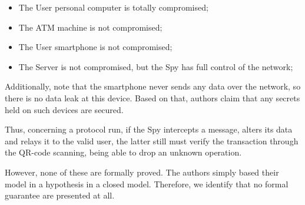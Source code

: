 \begin{itemize}
  \item The User personal computer is totally compromised;
  \item The ATM machine is not compromised;
  \item The User smartphone is not compromised;
  \item The Server is not compromised, but the Spy has full control of the network;
\end{itemize}

Additionally, note that the smartphone never sends any data over the network, so there is no data leak at this device. Based on that, authors claim that any secrets held on such devices are secured.

Thus, concerning a protocol run, if the Spy intercepts a message, alters its data and relays it to the valid user, the latter still must verify the transaction through the QR-code scanning, being able to drop an unknown operation.

However, none of these are formally proved. The authors simply based their model in a hypothesis in a closed model. Therefore, we identify that no formal guarantee are presented at all.
